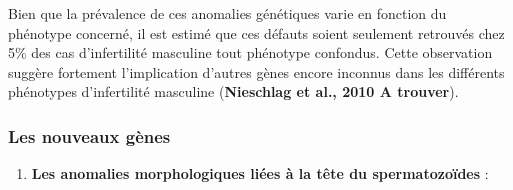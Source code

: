\documentclass[12pt,twoside]{reedthesis}
\providecommand{\tightlist}{%
  \setlength{\itemsep}{0pt}\setlength{\parskip}{0pt}}
\theoremstyle{definition}
\theoremstyle{definition}
\theoremstyle{remark}
\begin{document}
  Bien que la prévalence de ces anomalies génétiques varie en fonction du
  phénotype concerné, il est estimé que ces défauts soient seulement
  retrouvés chez 5\% des cas d'infertilité masculine tout phénotype
  confondus. Cette observation suggère fortement l'implication d'autres
  gènes encore inconnus dans les différents phénotypes d'infertilité
  masculine (\textbf{Nieschlag et al., 2010 A trouver}).
  
  \subsubsection{Les nouveaux gènes}\label{les-nouveaux-genes}
  
  \begin{enumerate}
  \def\labelenumi{\arabic{enumi}.}
  \tightlist
  \item
    \textbf{Les anomalies morphologiques liées à la tête du
    spermatozoïdes} :
  

\end{enumerate}
\end{document}

